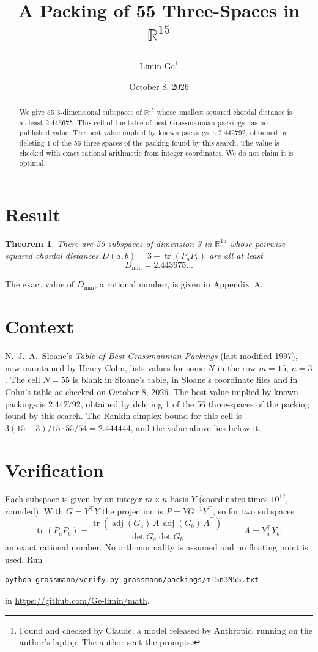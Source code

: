 \documentclass[11pt,a4paper]{article}
\title{A Packing of 55 Three-Spaces in $\mathbb{R}^{15}$}
\author{Limin Ge\thanks{Found and checked by Claude, a model released by Anthropic, running on the author's laptop. The author sent the prompts.}}
\date{October 8, 2026}
\newtheorem*{theorem}{Theorem}
\begin{document}
\maketitle
\begin{abstract}
We give 55 3-dimensional subspaces of $\mathbb{R}^{15}$ whose smallest squared chordal distance is at least 2.443675. This cell of the table of best Grassmannian packings has no published value. The best value implied by known packings is 2.442792, obtained by deleting 1 of the 56 three-spaces of the packing found by this search. The value is checked with exact rational arithmetic from integer coordinates. We do not claim it is optimal.
\end{abstract}

\section{Result}
\begin{theorem}
There are 55 subspaces of dimension 3 in $\mathbb{R}^{15}$ whose pairwise squared chordal distances $D(a,b) = 3 - \operatorname{tr}(P_aP_b)$ are all at least
\[ D_{\min} = 2.443675\ldots \]
\end{theorem}
The exact value of $D_{\min}$, a rational number, is given in Appendix~A.


\section{Context}
N.~J.~A.~Sloane's \emph{Table of Best Grassmannian Packings} (last modified 1997), now maintained by Henry Cohn, lists values for some $N$ in the row $m=15$, $n=3$. The cell $N=55$ is blank in Sloane's table, in Sloane's coordinate files and in Cohn's table as checked on October 8, 2026. The best value implied by known packings is 2.442792, obtained by deleting 1 of the 56 three-spaces of the packing found by this search. The Rankin simplex bound for this cell is $3(15-3)/15\cdot 55/54 = 2.444444$, and the value above lies below it.


\section{Verification}
Each subspace is given by an integer $m\times n$ basis $Y$ (coordinates times $10^{12}$, rounded). With $G=Y^\top Y$ the projection is $P=YG^{-1}Y^\top$, so for two subspaces
\[ \operatorname{tr}(P_aP_b)=\frac{\operatorname{tr}(\operatorname{adj}(G_a)\,A\,\operatorname{adj}(G_b)\,A^\top)}{\det G_a\det G_b},\qquad A=Y_a^\top Y_b, \]
an exact rational number. No orthonormality is assumed and no floating point is used. Run
\begin{verbatim}
python grassmann/verify.py grassmann/packings/m15n3N55.txt
\end{verbatim}
in \url{https://github.com/Ge-limin/math}.
\end{document}
